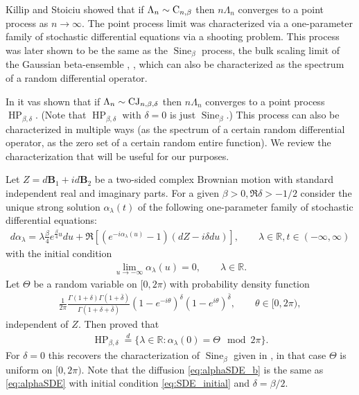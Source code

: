 \documentclass[12pt]{article}
\theoremstyle{definition} %
\newcommand{\R}{{\mathbb R}}
\theoremstyle{remark} %
\newcommand{\Sineb}{\operatorname{Sine}_{\beta}}
\newcommand{\HPb}{\operatorname{HP}_{\beta, \delta}}
\newcommand{\ed}{\stackrel{d}{=}}
\begin{document}
Killip and Stoiciu \cite{KS} showed that if $\Lambda_n\sim \textup{C}_{n,\beta}$ then $n\Lambda_n$ converges to a point process as $n\to \infty$. The point process limit was characterized via a one-parameter family of stochastic differential equations via a shooting problem.  This process was later shown to be the same as the   $\Sineb$ process, the bulk scaling limit of the Gaussian beta-ensemble \cite{BVBV_sbo}, \cite{Nakano}, which can also be characterized as the spectrum of a random differential operator.

In \cite{LV_HP} it vas shown that if $\Lambda_n\sim \textup{CJ}_{n,\beta,\delta}$ then $n \Lambda_n$ converges to a point process $\HPb$. (Note that $\HPb$ with $\delta=0$ is just $\Sineb$.) This process can also be characterized in multiple ways (as the spectrum of a certain random differential operator, as the zero set of a certain random entire function). We review the characterization that will be useful for our purposes. 

Let $Z=d\mathbf{B}_1+i d\mathbf{B}_2$ be a two-sided complex Brownian motion with standard independent real and imaginary parts. 
For a given $\beta>0, \Re \delta>-1/2$ consider the unique strong solution $\alpha_\lambda(t)$  of the following one-parameter family of stochastic differential equations:  
\begin{align}
    \label{eq:alphaSDE}
	d\alpha_\lambda = \lambda\tfrac{\beta}{4}e^{\frac{\beta}{4}u} du + \Re[(e^{-i\alpha_\lambda(u)}-1)(dZ-i\delta du)],\qquad \lambda\in \R, t\in(-\infty,\infty) 
\end{align}
with the initial condition
\begin{align}\label{eq:SDE_initial}
    \lim_{u\to-\infty} \alpha_\lambda(u)=0, \qquad \lambda\in \R. 
\end{align}
Let $\Theta$ be a random variable on $[0,2\pi)$ with probability density function 
\begin{align}\label{eq:Theta}
  {\frac{1}{2\pi}} \frac{\Gamma(1+\delta)\Gamma(1+\bar\delta)}{\Gamma(1+\delta+\bar\delta)}(1-e^{-i \theta})^\delta  (1-e^{i \theta})^{\bar \delta}, \qquad \theta\in [0,2\pi),
\end{align}
independent of $Z$.
Then \cite{LV_HP} proved that
\begin{align}\label{eq:HP}
    \HPb\ed\{\lambda\in \R: \alpha_\lambda(0)=\Theta \mod 2\pi\}.
\end{align}
For $\delta=0$ this recovers the characterization of $\Sineb$ given in \cite{KS},  in that case $\Theta$ is uniform on $[0,2\pi)$. Note that the diffusion \eqref{eq:alphaSDE_b} is the same as  \eqref{eq:alphaSDE} with initial condition \eqref{eq:SDE_initial} and $\delta=\beta/2$.
\end{document}
